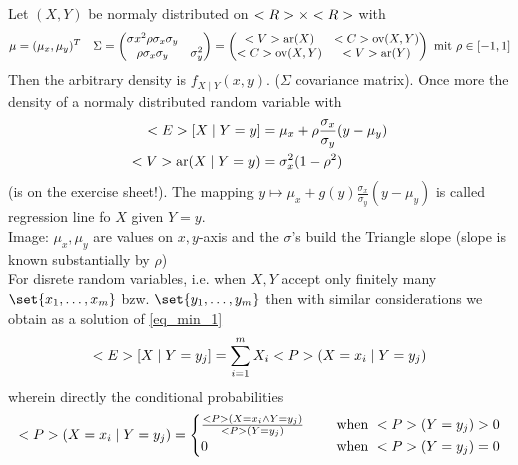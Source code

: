 \begin{*example}
	Let $(X,Y)$ be normaly distributed on $\R\times \R$ with
	\begin{align*}
		\mu = (\mu_x, \mu_y)^T \quad \Sigma = \begin{pmatrix}
			\sigma x^2 \rho\sigma_x \sigma_y\\
			\rho \sigma_x \sigma_y & \sigma_y^2
		\end{pmatrix} = \begin{pmatrix}
			\Var(X) & \Cov(X,Y)\\
			\Cov(X,Y) & \Var(Y)
		\end{pmatrix} \mit \rho \in [-1,1]
	\end{align*}
	Then the arbitrary density is $f_{X\mid Y}(x,y)$. ($\Sigma$ covariance matrix). Once more the density of a normaly distributed random variable with 
	\begin{align*}
		\E[X \mid Y=y] &= \mu_x + \rho \frac{\sigma_x}{\sigma_y}(y-\mu_y)\\
		\Var(X\mid Y=y) &= \sigma_x^2(1-\rho^2)
	\end{align*}
	(is on the exercise sheet!). The mapping $y \mapsto \mu_x + g(y)\frac{\sigma_x}{\sigma_y}(y-\mu_y)$ is called regression line fo $X$ given $Y=y$.\\
	Image: $\mu_x,\mu_y$ are values on $x,y$-axis and the $\sigma$'s build the Triangle slope (slope is known substantially by $\rho$)\\
	For disrete random variables, i.e. when $X,Y$ accept only finitely many $\set{x_1,\dots,x_m}$ bzw. $\set{y_1,\dots,y_m}$ then with similar considerations we obtain as a solution of \eqref{eq_min_1}
	\begin{align*}
		\E[X\mid Y=y_j] = \sum_{i=1}^m X_i \P(X=x_i \mid Y=y_j)
	\end{align*}
	wherein directly the conditional probabilities
	\begin{align*}
		\P(X=x_i \mid Y=y_j) = \begin{cases}
			\frac{\P(X=x_i \wedge Y=y_j)}{\P(Y=y_j)} &\quad \text{ when } \P(Y=y_j) > 0\\
			0 &\quad \text{ when } \P(Y=y_j) = 0 
		\end{cases}
	\end{align*}
\end{*example}
